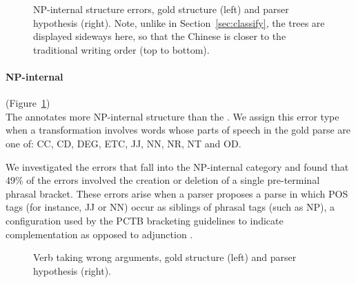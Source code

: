 \begin{figure}
\centering
  \caption[Error analysis example: NP internal (Chinese).]{ \label{fig:np_internal} 
    NP-internal structure errors, gold structure (left) and parser hypothesis (right).
    Note, unlike in Section~\ref{sec:classify}, the trees are displayed sideways here, so that the Chinese is closer to the traditional writing order (top to bottom).
  }
\end{figure}

\paragraph{NP-internal} (Figure~\ref{fig:np_internal}) \\
The \pctb annotates more NP-internal structure than the \ptb.
We assign this error type when a transformation involves words whose parts of speech in the gold parse are one of: CC, CD, DEG, ETC, JJ, NN, NR, NT and OD.

We investigated the errors that fall into the NP-internal category and found that 49\% of the errors involved the creation or deletion of a single pre-terminal phrasal bracket.
These errors arise when a parser proposes a parse in which POS tags (for instance, JJ or NN) occur as siblings of phrasal tags (such as NP), a configuration used by the PCTB bracketing guidelines to indicate complementation as opposed to adjunction \parencite{Xue:2005:NLE}.

\begin{figure}
\centering
  \caption[Error analysis example: Verb taking wrong arguments (Chinese).]{ \label{fig:wrong_arg}
    Verb taking wrong arguments, gold structure (left) and parser hypothesis (right).
  }
\end{figure}

